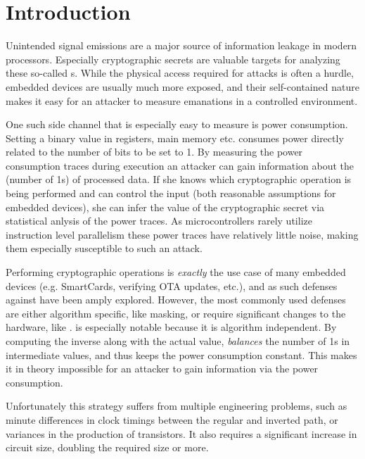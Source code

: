 \chapter{Introduction}
Unintended signal emissions are a major source of information leakage in modern processors.
Especially cryptographic secrets are valuable targets for analyzing these so-called \sidechannel{}s.
While the physical access required for \sidechannel{} attacks is often a hurdle, embedded devices are usually much more exposed, and their self-contained nature makes it easy for an attacker to measure \sidechannel{} emanations in a controlled environment.

One such side channel that is especially easy to measure is power consumption.
Setting a binary value in registers, main memory etc. consumes power directly related to the number of bits to be set to 1\cite{brier2004correlation}.
By measuring the power consumption traces during execution an attacker can gain information about the \hammingw{} (number of 1s) of processed data.
If she knows which cryptographic operation is being performed and can control the input (both reasonable assumptions for embedded devices), she can infer the value of the cryptographic secret via statistical anlysis of the power traces.\cite{brier2004correlation}
As microcontrollers rarely utilize instruction level parallelism these power traces have relatively little noise, making them especially susceptible to such an attack.

Performing cryptographic operations is \emph{exactly} the use case of many embedded devices (e.g. SmartCards, verifying OTA updates, etc.), and as such defenses against \poweranalysis{} have been amply explored.
However, the most commonly used defenses are either algorithm specific, like masking, or require significant changes to the hardware, like \dual{}\cite{sokolov2005design}.
\dual{} is especially notable because it is algorithm independent.
By computing the inverse along with the actual value, \dual{} \emph{balances} the number of 1s in intermediate values, and thus keeps the power consumption constant.
This makes it in theory impossible for an attacker to gain information via the power consumption.

Unfortunately this strategy suffers from multiple engineering problems, such as minute differences in clock timings between the regular and inverted path\cite{baddam2008path}, or variances in the production of transistors\cite{razafindraibe2006formal}.
It also requires a significant increase in circuit size, doubling the required size or more\cite{baddam2008path}.

